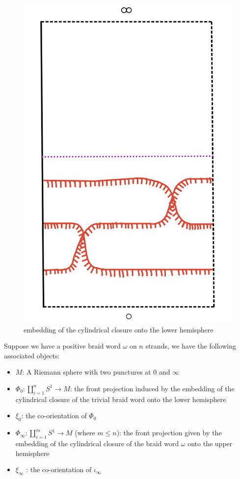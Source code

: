 \begin{figure}[H] 
    \centering
    \includegraphics[scale = 0.95]{diagrams/natural_alternating_diagrams/4-2.png} 
    \caption{embedding of the cylindrical closure onto the lower hemisphere}
    \label{fig:your-label}
\end{figure}

Suppose we have a positive braid word $\omega$ on $n$ strands, we have the following associated objects: 
\begin{itemize}
\item $M$: A Riemann sphere with two punctures at $0$ and $\infty$

\item $\Phi_0 : \coprod_{i=1}^{n} S^1 \rightarrow  M$: the front projection induced by the embedding of the cylindrical closure of the trivial braid word onto the lower hemisphere

\item $\xi_0$: the co-orientation of $\Phi_0$

\item $\Phi_\infty : \coprod_{i=1}^{m} S^1 \rightarrow M$ (where $m \leq n$): the front projection given by the embedding of the cylindrical closure of the braid word $\omega$ onto the upper hemisphere

\item $\xi_\infty$ : the co-orientation of $\iota_\infty$
\end{itemize}

